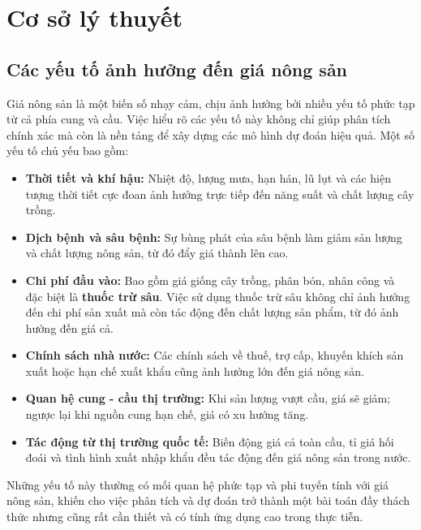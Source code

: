 \section{Cơ sở lý thuyết}
\subsection{ Các yếu tố ảnh hưởng đến giá nông sản}

Giá nông sản là một biến số nhạy cảm, chịu ảnh hưởng bởi nhiều yếu tố phức tạp từ cả phía cung và cầu. Việc hiểu rõ các yếu tố này không chỉ giúp phân tích chính xác mà còn là nền tảng để xây dựng các mô hình dự đoán hiệu quả. Một số yếu tố chủ yếu bao gồm:

\begin{itemize}
    \item \textbf{Thời tiết và khí hậu:} Nhiệt độ, lượng mưa, hạn hán, lũ lụt và các hiện tượng thời tiết cực đoan ảnh hưởng trực tiếp đến năng suất và chất lượng cây trồng.
    
    \item \textbf{Dịch bệnh và sâu bệnh:} Sự bùng phát của sâu bệnh làm giảm sản lượng và chất lượng nông sản, từ đó đẩy giá thành lên cao.

    \item \textbf{Chi phí đầu vào:} Bao gồm giá giống cây trồng, phân bón, nhân công và đặc biệt là \textbf{thuốc trừ sâu}. Việc sử dụng thuốc trừ sâu không chỉ ảnh hưởng đến chi phí sản xuất mà còn tác động đến chất lượng sản phẩm, từ đó ảnh hưởng đến giá cả.

    \item \textbf{Chính sách nhà nước:} Các chính sách về thuế, trợ cấp, khuyến khích sản xuất hoặc hạn chế xuất khẩu cũng ảnh hưởng lớn đến giá nông sản.

    \item \textbf{Quan hệ cung - cầu thị trường:} Khi sản lượng vượt cầu, giá sẽ giảm; ngược lại khi nguồn cung hạn chế, giá có xu hướng tăng.

    \item \textbf{Tác động từ thị trường quốc tế:} Biến động giá cả toàn cầu, tỉ giá hối đoái và tình hình xuất nhập khẩu đều tác động đến giá nông sản trong nước.
\end{itemize}

Những yếu tố này thường có mối quan hệ phức tạp và phi tuyến tính với giá nông sản, khiến cho việc phân tích và dự đoán trở thành một bài toán đầy thách thức nhưng cũng rất cần thiết và có tính ứng dụng cao trong thực tiễn.


